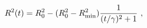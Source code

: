\begin{equation}\label{sono1}
R^2(t)=R_{0}^{2}-(R_0^2-R_{\rm min}^2)\frac{1}{(t/\gamma)^2+1}~,
\end{equation}

